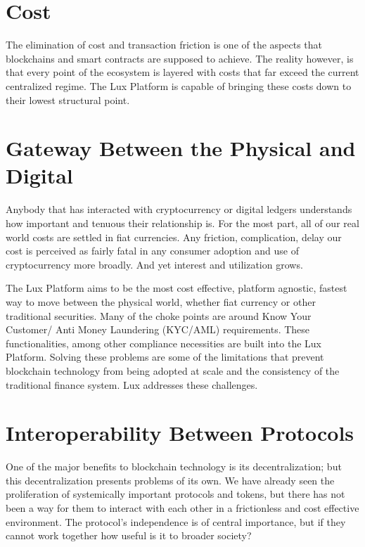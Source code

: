 \documentclass[11pt]{article}
\begin{document}
\section{Cost}

The elimination of cost and transaction friction is one of the aspects that blockchains and smart contracts are supposed to achieve. The reality however, is that every point of the ecosystem is layered with costs that far exceed the current centralized regime. The Lux Platform is capable of bringing these costs down to their lowest structural point.


\section{Gateway Between the Physical and Digital}

Anybody that has interacted with cryptocurrency or digital ledgers understands how important and tenuous their relationship is. For the most part, all of our real world costs are settled in fiat currencies. Any friction, complication, delay our cost is perceived as fairly fatal in any consumer adoption and use of cryptocurrency more broadly. And yet interest and utilization grows.


The Lux Platform aims to be the most cost effective, platform agnostic, fastest way to move between the physical world, whether fiat currency or other traditional securities. Many of the choke points are around Know Your Customer/ Anti Money Laundering (KYC/AML) requirements. These functionalities, among other compliance necessities are built into the Lux Platform. Solving these problems are some of the limitations that prevent blockchain technology from being adopted at scale and the consistency of the traditional finance system. Lux addresses these challenges.


\section{Interoperability Between Protocols}

One of the major benefits to blockchain technology is its decentralization; but this decentralization presents problems of its own. We have already seen the proliferation of systemically important protocols and tokens, but there has not been a way for them to interact with each other in a frictionless and cost effective environment. The protocol's independence is of central importance, but if they cannot work together how useful is it to broader society?
\end{document}
